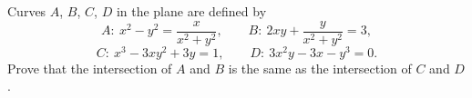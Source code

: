Curves $A$, $B$, $C$, $D$ in the plane are defined by
\[A:\ x^2-y^2=\dfrac{x}{x^2+y^2},\qquad B:\ 2xy+\dfrac{y}{x^2+y^2}=3,\]
\[C:\ x^3-3xy^2+3y=1,\qquad D:\ 3x^2y-3x-y^3=0.\]
Prove that the intersection of $A$ and $B$ is the same as the intersection of $C$ and $D$.
